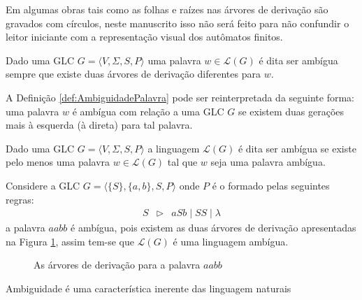 \begin{note}
	Em algumas obras tais como \cite{benjaLivro2010} as folhas e raízes nas árvores de derivação são gravados com círculos, neste manuscrito isso não será feito para não confundir o leitor iniciante com a representação visual dos autômatos finitos.
\end{note}

\begin{definition}[Ambiguidade]\label{def:AmbiguidadePalavra}
	Dado uma GLC $G = \langle V, \Sigma, S, P\rangle$ uma palavra $w \in \mathcal{L}(G)$ é dita ser ambígua sempre que existe duas árvores de derivação diferentes para $w$.
\end{definition}

A Definição \ref{def:AmbiguidadePalavra} pode ser reinterpretada da seguinte forma: uma palavra $w$ é ambígua com relação a uma GLC $G$ se existem duas gerações mais à esquerda (à direta) para tal palavra.

\begin{definition}\label{def:LinguagemAmbiguidade}
	Dado uma GLC $G = \langle V, \Sigma, S, P\rangle$ a linguagem $\mathcal{L}(G)$ é dita ser ambígua se existe pelo menos uma palavra $w \in \mathcal{L}(G)$ tal que $w$ seja uma palavra ambígua.
\end{definition}

\begin{example}
	Considere a GLC $G = \langle \{S\}, \{a, b\}, S, P \rangle$ onde $P$ é o formado pelas seguintes regras:
	\begin{eqnarray*}
		S & \rhd & aSb \mid SS \mid \lambda
	\end{eqnarray*}
	a palavra $aabb$ é ambígua, pois existem as duas árvores de derivação apresentadas na Figura \ref{fig:ArvoresAmbuigas}, assim tem-se que $\mathcal{L}(G)$ é uma linguagem ambígua.
	
	\begin{figure}[h]
		\centering
		\hfill
		\caption{As árvores de derivação para a palavra $aabb$}
		\label{fig:ArvoresAmbuigas}
	\end{figure}
\end{example}

Ambiguidade é uma característica inerente das linguagem naturais \cite{benjaLivro2010}